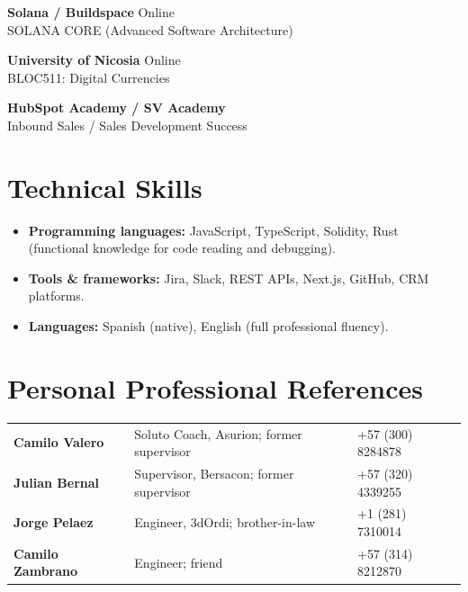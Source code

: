 \documentclass[10pt,letterpaper]{article}
\begin{document}
\vspace{4pt}
\textbf{Solana / Buildspace} \hfill {\color{muted}\small Online}\\
SOLANA CORE (Advanced Software Architecture)

\vspace{4pt}
\textbf{University of Nicosia} \hfill {\color{muted}\small Online}\\
BLOC511: Digital Currencies

\vspace{4pt}
\textbf{HubSpot Academy / SV Academy}\\
Inbound Sales / Sales Development Success

\section{Technical Skills}
\begin{itemize}
  \item \textbf{Programming languages:} JavaScript, TypeScript, Solidity, Rust (functional knowledge for code reading and debugging).
  \item \textbf{Tools \& frameworks:} Jira, Slack, REST APIs, Next.js, GitHub, CRM platforms.
  \item \textbf{Languages:} Spanish (native), English (full professional fluency).
\end{itemize}

\section{Personal Professional References}
\begin{tabularx}{\textwidth}{@{}>{\raggedright\arraybackslash}p{}>{\raggedright\arraybackslash}X>{\raggedleft\arraybackslash}p{}@{}}
\textbf{Camilo Valero} & Soluto Coach, Asurion; former supervisor & +57 (300) 8284878 \\
\textbf{Julian Bernal} & Supervisor, Bersacon; former supervisor & +57 (320) 4339255 \\
\textbf{Jorge Pelaez} & Engineer, 3dOrdi; brother-in-law & +1 (281) 7310014 \\
\textbf{Camilo Zambrano} & Engineer; friend & +57 (314) 8212870 \\
\end{tabularx}
\end{document}
